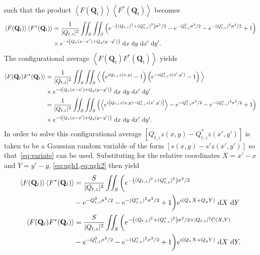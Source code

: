 \documentclass[10pt,twoside, b5paper,pdftex]{report}
\newcommand{\lik}[0]{\ensuremath{&=}}
\newcommand{\E}[1]{\left\langle #1 \right\rangle}
\begin{document}
such that the product $\E{F(\mathbf{Q}_{t})}\E{F^{*}(\mathbf{Q}_{t})}$ becomes
\begin{align}
	\E{F(\mathbf{Q}_{t})}\E{F^{*}(\mathbf{Q}_{t})} \lik \frac{1}{|Q_{t,z}|^2}\iint_{S}\iint_{S} \left( e^{-\left((Q_{t,z})^{2}+(Q^{*}_{t,z})^{2}\right) \sigma^{2}/2 }  - e^{-Q_{t,z}^{2} \sigma^{2}/2 } - e^{-(Q^{*}_{t,z})^{2} \sigma^{2}/2 } +1 \right) \notag\\
	&\times  e^{-i\left(Q_{x}(x - x')+Q_{y}(y - y')\right)}\mbox{~d}x \mbox{~d}y \mbox{~d}x' \mbox{~d}y' .\label{eq:ugh1}
\end{align}
The configurational average $\E{F(\mathbf{Q}_{t})F^{*}(\mathbf{Q}_{t})}$ yields  
\begin{align}
	\E{F(\mathbf{Q}_{t})F^{*}(\mathbf{Q}_{t})} \lik  \frac{1}{|Q_{t,z}|^2}\iint_{S}\iint_{S} \Big\langle\left(e^{i Q_{t,z}z(x,y)}-1\right)\left(e^{-i Q^{*}_{t,z}z(x',y')}-1\right)\Big\rangle\notag \\
	&\times  e^{-i\left(Q_{x}(x - x')+Q_{y}(y - y')\right)}\mbox{~d}x \mbox{~d}y \mbox{~d}x' \mbox{~d}y' \notag\\
	\lik  \frac{1}{|Q_{t,z}|^2}\iint_{S}\iint_{S} \left( \left\langle e^{i \left[Q_{t,z} z(x,y)- Q^{*}_{t,z} z(x',y') \right]}\right\rangle  - e^{-Q_{t,z}^{2} \sigma^{2}/2 } - e^{-(Q^{*}_{t,z})^{2} \sigma^{2}/2 } +1 \right) \notag\\
	&\times  e^{-i\left(Q_{x}(x - x')+Q_{y}(y - y')\right)}\mbox{~d}x \mbox{~d}y \mbox{~d}x' \mbox{~d}y' . \label{eq:ugh2}
\end{align}   
%
In order to solve this configurational average $[Q_{t,z} z(x,y)- Q^{*}_{t,z} z(x',y')]$ is taken to be a Gaussian random variable of the form $[s(x,y) -s'z(x',y')]$ so that~\cref{eq:variate} can be used. Substituting for the relative coordinates $X = x' - x$ and $Y = y' - y$, \cref{eq:ugh1,eq:ugh2} then yield
\begin{align}	
	\E{F(\mathbf{Q}_{t})}\E{F^{*}(\mathbf{Q}_{t})} \lik \frac{S}{|Q_{t,z}|^2}\iint_{S} \bigg( e^{-\left((Q_{t,z})^{2}+(Q^{*}_{t,z})^{2}\right) \sigma^{2}/2 }   \notag\\
	&- e^{-Q_{t,z}^{2} \sigma^{2}/2 } - e^{-(Q^{*}_{t,z})^{2} \sigma^{2}/2 } +1 \bigg)  e^{i\left(Q_{x}X+Q_{y}Y\right)}\mbox{~d}X \mbox{~d}Y  \label{eq:alal}	\\
    \E{F(\mathbf{Q}_{t})F^{*}(\mathbf{Q}_{t})} \lik  \frac{S}{|Q_{t,z}|^2}\iint_{S} \bigg( e^{-\left((Q_{t,z})^{2}+(Q^{*}_{t,z})^{2}\right) \sigma^{2}/2 + |Q_{t,z}|^2 C(X, Y)}   \notag\\
	&- e^{-Q_{t,z}^{2} \sigma^{2}/2 } - e^{-(Q^{*}_{t,z})^{2} \sigma^{2}/2 } +1 \bigg) e^{i\left(Q_{x}X+Q_{y}Y\right)}\mbox{~d}X \mbox{~d}Y. \label{eq:olol}
\end{align}   
\end{document}
